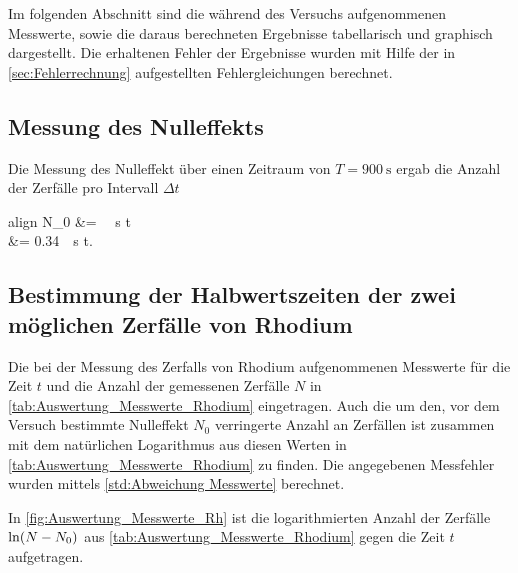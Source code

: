Im folgenden Abschnitt sind die während des Versuchs aufgenommenen Messwerte,
sowie die daraus berechneten Ergebnisse tabellarisch und graphisch dargestellt.
Die erhaltenen Fehler der Ergebnisse wurden mit Hilfe der in \cref{sec:Fehlerrechnung}
aufgestellten Fehlergleichungen berechnet.


\subsection{Messung des Nulleffekts}

	Die Messung des Nulleffekt über einen Zeitraum von $T = \SI{900}{\second}$ 
	ergab die Anzahl der Zerfälle pro Intervall $\Delta t$ 
	\begin{empheq}{align}
		\notag
		N_{0} &= \ \si{\per\second} \cdot \Delta t\\    
		&= \SI{0.34}{\per\second}  \cdot \Delta t. 
	\end{empheq} 

\subsection{Bestimmung der Halbwertszeiten der zwei möglichen Zerfälle von Rhodium}
	
	Die bei der Messung des Zerfalls von Rhodium aufgenommenen Messwerte
	für die Zeit $t$ und die Anzahl der gemessenen Zerfälle $N$ in \cref{tab:Auswertung_Messwerte_Rhodium}
	eingetragen. Auch die um den, vor dem Versuch bestimmte Nulleffekt $N_{0}$
    verringerte Anzahl an Zerfällen ist zusammen mit dem natürlichen Logarithmus
    aus diesen Werten in \cref{tab:Auswertung_Messwerte_Rhodium} zu finden.
    Die angegebenen Messfehler wurden mittels \cref{std:Abweichung Messwerte} berechnet.
    
   	 
   	
   	In \cref{fig:Auswertung_Messwerte_Rh} ist die logarithmierten Anzahl der Zerfälle $\Ln{N - N_{0}}$ aus \cref{tab:Auswertung_Messwerte_Rhodium} gegen die Zeit $t$ aufgetragen.  
   	
     
